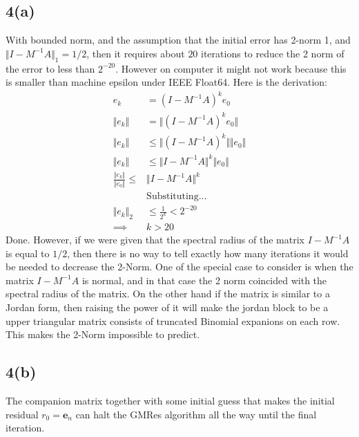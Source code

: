 \documentclass[]{article}
\begin{document}
    \subsection*{4(a)}
        With bounded norm, and the assumption that the initial error has 2-norm 1, and $\Vert I - M^{-1}A\Vert_1 = 1/2$, then it requires about $20$ iterations to reduce the 2 norm of the error to less than $2^{-20}$. However on computer it might not work because this is smaller than machine epsilon under IEEE Float64. Here is the derivation: 
        \begin{align*}\tag{5.a.1}\label{eqn:5.a.1}
            e_k &= (I - M^{-1}A)^ke_0
            \\
            \Vert e_k\Vert &= 
            \Vert (I - M^{-1}A)^ke_0\Vert
            \\
            \Vert e_k\Vert 
            &\le 
            \Vert (I - M^{-1}A)^k\Vert \Vert e_0\Vert
            \\
            \Vert e_k\Vert
            &\le
            \Vert I - M^{-1}A\Vert^k \Vert e_0\Vert 
            \\
            \frac{\Vert e_k\Vert}{\Vert e_0\Vert}
            \le& \Vert I - M^{-1}A\Vert^k
            \\
            & \text{Substituting...}
            \\
            \Vert e_k\Vert_2 &\le \frac{1}{2^k} < 2^{-20}
            \\
            \implies& k > 20
        \end{align*}
        Done. However, if we were given that the spectral radius of the matrix $I - M^{-1}A$ is equal to $1/2$, then there is no way to tell exactly how many iterations it would be needed to decrease the 2-Norm. One of the special case to consider is when the matrix $I - M^{-1}A$ is normal, and in that case the 2 norm coincided with the spectral radius of the matrix. On the other hand if the matrix is similar to a Jordan form, then raising the power of it will make the jordan block to be a upper triangular matrix consists of truncated Binomial expanions on each row. This makes the 2-Norm impossible to predict. 
    \subsection*{4(b)}
        The companion matrix together with some initial guess that makes the initial residual $r_0 = \mathbf{e}_n$ can halt the GMRes algorithm all the way until the final iteration. 
\end{document}
